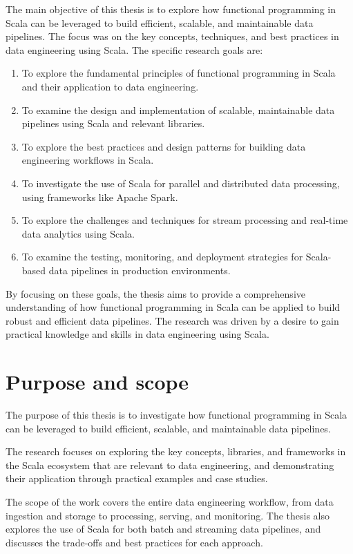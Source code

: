 The main objective of this thesis is to explore how functional programming in Scala can be leveraged to build efficient, scalable, and maintainable data pipelines. The focus was on the key concepts, techniques, and best practices in data engineering using Scala. The specific research goals are:

\begin{enumerate}
    \item To explore the fundamental principles of functional programming in Scala and their application to data engineering.
    \item To examine the design and implementation of scalable, maintainable data pipelines using Scala and relevant libraries.
    \item To explore the best practices and design patterns for building data engineering workflows in Scala.
    \item To investigate the use of Scala for parallel and distributed data processing, using frameworks like Apache Spark.
    \item To explore the challenges and techniques for stream processing and real-time data analytics using Scala.
    \item To examine the testing, monitoring, and deployment strategies for Scala-based data pipelines in production environments.
\end{enumerate}

By focusing on these goals, the thesis aims to provide a comprehensive understanding of how functional programming in Scala can be applied to build robust and efficient data pipelines. The research was driven by a desire to gain practical knowledge and skills in data engineering using Scala.

\section*{Purpose and scope}

The purpose of this thesis is to investigate how functional programming in Scala can be leveraged to build efficient, scalable, and maintainable data pipelines. 

The research focuses on exploring the key concepts, libraries, and frameworks in the Scala ecosystem that are relevant to data engineering, and demonstrating their application through practical examples and case studies. 

The scope of the work covers the entire data engineering workflow, from data ingestion and storage to processing, serving, and monitoring. The thesis also explores the use of Scala for both batch and streaming data pipelines, and discusses the trade-offs and best practices for each approach.

